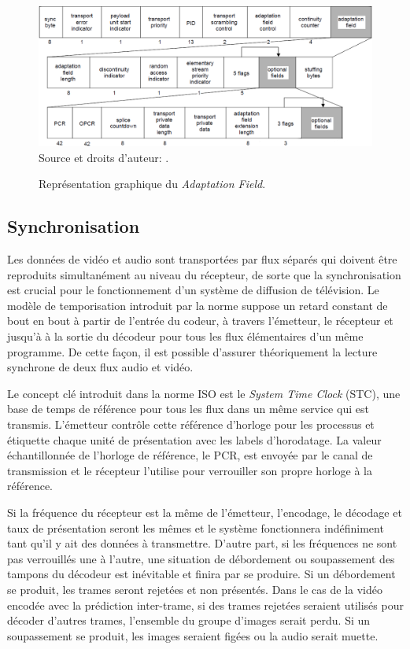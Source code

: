 \documentclass[12pt,a4paper]{article}
\begin{document}
\begin{figure}
\centering
\caption{Représentation graphique du  \textit{Adaptation Field}.}
\includegraphics[width=1\linewidth]{pictures/AdapField_iso13818.png}
\\Source et droits d'auteur: \cite[F.0.1]{ISO}.
\label{fig:AdapField_iso13818}
\end{figure}

\subsection{Synchronisation}
\label{Timing}

Les données de vidéo et audio sont transportées par flux séparés qui doivent être reproduits simultanément au niveau du récepteur, de sorte que la synchronisation est crucial pour le fonctionnement d'un système de diffusion de télévision. Le modèle de temporisation introduit par la norme suppose un retard constant de bout en bout à partir de l'entrée du codeur, à travers l'émetteur, le récepteur et jusqu'à à la sortie du décodeur pour tous les flux élémentaires d'un même programme. De cette façon, il est possible d'assurer théoriquement la lecture synchrone de deux flux audio et vidéo.

Le concept clé introduit dans la norme ISO est le \textit{System Time Clock} (STC), une base de temps de référence pour tous les flux dans un même service qui est transmis. L'émetteur contrôle cette référence d'horloge pour les processus et étiquette chaque unité de présentation avec les labels d'horodatage. La valeur échantillonnée de l'horloge de référence, le PCR, est envoyée par le canal de transmission et le récepteur l'utilise pour verrouiller son propre horloge à la référence.

Si la fréquence du récepteur est la même de l'émetteur, l'encodage, le décodage et taux de présentation seront les mêmes et le système fonctionnera indéfiniment tant qu'il y ait des données à transmettre. D'autre part, si les fréquences ne sont pas verrouillés une à l'autre, une situation de débordement ou soupassement des tampons du décodeur est inévitable et finira par se produire. Si un débordement se produit, les trames seront rejetées et non présentés. Dans le cas de la vidéo encodée avec la prédiction inter-trame, si des trames rejetées seraient utilisés pour décoder d'autres trames, l'ensemble du groupe d'images serait perdu. Si un soupassement se produit, les images seraient figées ou la audio serait muette.
\end{document}
